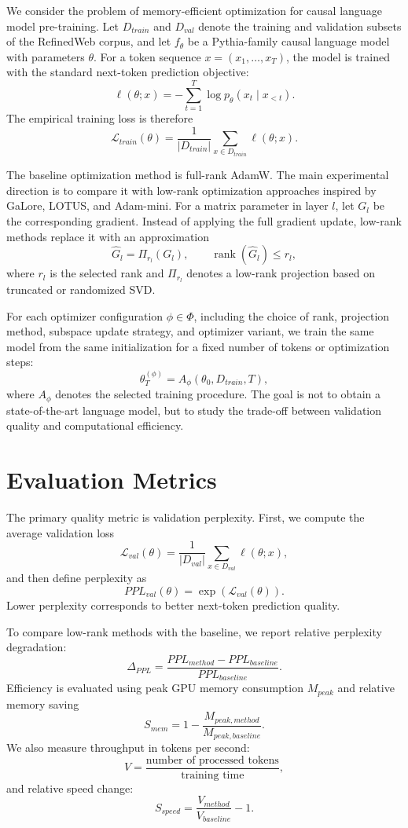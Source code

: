 \documentclass[conference]{IEEEtran}
\begin{document}
We consider the problem of memory-efficient optimization for causal language model pre-training. Let $D_{train}$ and $D_{val}$ denote the training and validation subsets of the RefinedWeb corpus, and let $f_\theta$ be a Pythia-family causal language model with parameters $\theta$. For a token sequence $x=(x_1,\ldots,x_T)$, the model is trained with the standard next-token prediction objective:
\[
    \ell(\theta; x) = - \sum_{t=1}^{T} \log p_\theta(x_t \mid x_{<t}).
\]
The empirical training loss is therefore
\[
    \mathcal{L}_{train}(\theta) =
    \frac{1}{|D_{train}|}
    \sum_{x \in D_{train}} \ell(\theta; x).
\]

The baseline optimization method is full-rank AdamW. The main experimental direction is to compare it with low-rank optimization approaches inspired by GaLore, LOTUS, and Adam-mini. For a matrix parameter in layer $l$, let $G_l$ be the corresponding gradient. Instead of applying the full gradient update, low-rank methods replace it with an approximation
\[
    \widehat{G}_l = \Pi_{r_l}(G_l), \qquad
    \operatorname{rank}(\widehat{G}_l) \le r_l,
\]
where $r_l$ is the selected rank and $\Pi_{r_l}$ denotes a low-rank projection based on truncated or randomized SVD.

For each optimizer configuration $\phi \in \Phi$, including the choice of rank, projection method, subspace update strategy, and optimizer variant, we train the same model from the same initialization for a fixed number of tokens or optimization steps:
\[
    \theta_T^{(\phi)} = A_\phi(\theta_0, D_{train}, T),
\]
where $A_\phi$ denotes the selected training procedure. The goal is not to obtain a state-of-the-art language model, but to study the trade-off between validation quality and computational efficiency.

\section{Evaluation Metrics}

The primary quality metric is validation perplexity. First, we compute the average validation loss
\[
    \mathcal{L}_{val}(\theta) =
    \frac{1}{|D_{val}|}
    \sum_{x \in D_{val}} \ell(\theta; x),
\]
and then define perplexity as
\[
    PPL_{val}(\theta) = \exp(\mathcal{L}_{val}(\theta)).
\]
Lower perplexity corresponds to better next-token prediction quality.

To compare low-rank methods with the baseline, we report relative perplexity degradation:
\[
    \Delta_{PPL} =
    \frac{PPL_{method} - PPL_{baseline}}
    {PPL_{baseline}}.
\]
Efficiency is evaluated using peak GPU memory consumption $M_{peak}$ and relative memory saving
\[
    S_{mem} =
    1 - \frac{M_{peak, method}}{M_{peak, baseline}}.
\]
We also measure throughput in tokens per second:
\[
    V = \frac{\text{number of processed tokens}}{\text{training time}},
\]
and relative speed change:
\[
    S_{speed} =
    \frac{V_{method}}{V_{baseline}} - 1.
\]
\end{document}
